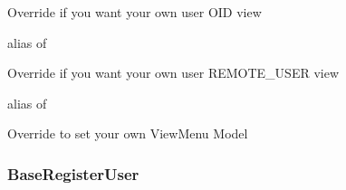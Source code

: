 \documentclass[letterpaper,10pt,english]{sphinxmanual}
\begin{document}
\begin{fulllineitems}
\begin{fulllineitems}
\label{api:flask.ext.appbuilder.security.manager.BaseSecurityManager.useroidmodelview}
Override if you want your own user OID view

alias of 

\end{fulllineitems}


\begin{fulllineitems}
\label{api:flask.ext.appbuilder.security.manager.BaseSecurityManager.userremoteusermodelview}
Override if you want your own user REMOTE\_USER view

alias of 

\end{fulllineitems}


\begin{fulllineitems}
\label{api:flask.ext.appbuilder.security.manager.BaseSecurityManager.viewmenu_model}
Override to set your own ViewMenu Model

\end{fulllineitems}


\end{fulllineitems}



\subsubsection{BaseRegisterUser}
\label{api:baseregisteruser}\label{api:module-flask.ext.appbuilder.security.registerviews}
\end{document}

